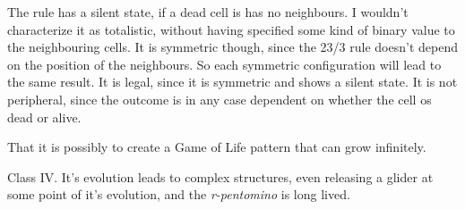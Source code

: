 \documentclass[10pt,a4paper,boxed]{hmcpset}
\begin{document}
\begin{problem}[Assignment 16]
\end{problem}
\begin{solution}
The rule has a silent state, if a dead cell is has no neighbours. I wouldn't characterize it as totalistic, without having specified some kind of binary value to the neighbouring cells. It is symmetric though, since the 23/3 rule doesn't depend on the position of the neighbours. So each symmetric configuration will lead to the same result. It is legal, since it is symmetric and shows a silent state. It is not peripheral, since the outcome is in any case dependent on whether the cell os dead or alive.
\end{solution}


\begin{problem}[Assignment 17]
\end{problem}
\begin{solution}
That it is possibly to create a Game of Life pattern that can grow infinitely.
\end{solution}


\begin{problem}[Assignment 18]
\end{problem}
\begin{solution}
Class IV. It's evolution leads to complex structures, even releasing a glider at some point of it's evolution, and the \emph{r-pentomino} is long lived.
\end{solution}
\end{document}

